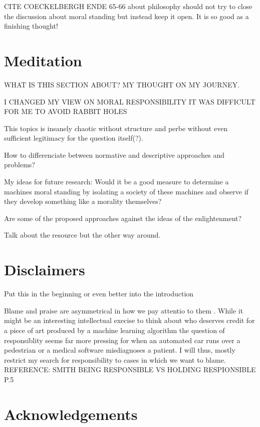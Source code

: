 \documentclass{article}
\begin{document}
CITE COECKELBERGH ENDE 65-66 about philosophy should not try to close the
discussion about moral standing but instead keep it open. It is so good as a
finishing thought!
\section{Meditation}
WHAT IS THIS SECTION ABOUT?
MY THOUGHT ON MY JOURNEY.

I CHANGED MY VIEW ON MORAL RESPONSIBILITY
IT WAS DIFFICULT FOR ME TO AVOID RABBIT HOLES

This topics is insanely chaotic without structure and perbe without even
sufficient legitimacy for the question itself(?).

How to differenciate between normative and descriptive approaches and problems?

My ideas for future research: Would it be a good measure to determine a machines
moral standing by isolating a society of these machines and observe if they
develop something like a morality themselves?

Are some of the proposed approaches against the ideas of the enlightenment?

Talk about the resource but the other way around.
\section{Disclaimers}
Put this in the beginning or even better into the introduction

Blame and praise are asymmetrical in how we pay attentio to them . While it
might be an interesting intellectual execise to think about who deserves credit
for a piece of art produced by a machine learning algorithm the question of
responsiblity seems far more pressing for when an automated car runs over a
pedestrian or a medical software misdiagnoses a patient. I will thus, mostly
restrict my search for responsibility to cases in which we want to blame.
REFERENCE: SMITH BEING RESPONSIBLE VS HOLDING RESPIONSIBLE P.5
\section{Acknowledgements}
\clearpage

\printglossary[type=\acronymtype]
\printglossary
\printbibliography
\end{document}
